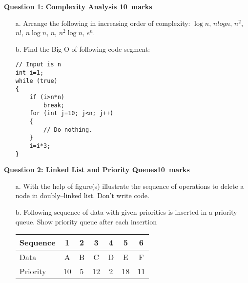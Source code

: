 \documentclass[12pt,a4paper]{article}
\def\Qone{10}
\def\Qtwo{10}
\def\SingleSpacing{\def\baselinestretch{1}\large\normalsize}
\begin{document}
\newpage
\pagestyle{fancy}
\noindent\textbf{Question 1: Complexity Analysis \hfill \Qone~marks}
\begin{itemize}
\item[a.] Arrange the following in increasing order of complexity: $\log n$, $n logn$, $n^2$, $n!$, $n\log n$, $n$, $n^2\log n$, $e^n$.\vspace{8cm}
\item[b.] Find the Big O of following code segment:
\begin{lstlisting}
// Input is n
int i=1;
while (true)
{
	if (i>n*n)
		break;
	for (int j=10; j<n; j++)
	{
		// Do nothing.
	}
	i=i*3;
}
\end{lstlisting}
\end{itemize}
\newpage
\noindent\textbf{Question 2: Linked List and Priority Queues\hfill \Qtwo~marks}
\begin{itemize}
\item[a.] With the help of figure(s) illustrate the sequence of operations to delete a node in doubly--linked list. Don't write code.\vspace{8cm}
\item[b.] Following sequence of data with given priorities is inserted in a priority queue. Show priority queue after each insertion\\
\begin{table}[H]
\begin{center}
\vspace{0.3cm}
\SingleSpacing
	\begin{tabular}{lcccccc}
	\hline \hline
		\rule{0pt}{2.6ex}Sequence & 1 & 2& 3& 4& 5& 6\\
		\hline
		\rule{0pt}{2.6ex}Data & A & B& C& D& E& F\\
		Priority& 10 & 5& 12& 2& 18& 11\\
	\hline \hline
	\end{tabular}
\end{center}
\end{table}
\end{itemize}
\end{document}
